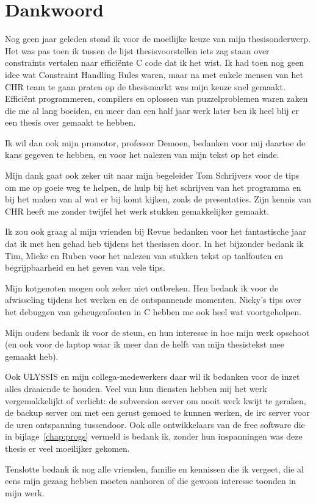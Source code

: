\section*{Dankwoord}

Nog geen jaar geleden stond ik voor de moeilijke keuze van mijn thesisonderwerp. Het was pas toen ik tussen de lijst thesisvoorstellen iets zag staan over constraints vertalen naar effici\"ente C code dat ik het wist. Ik had toen nog geen idee wat Constraint Handling Rules waren, maar na met enkele mensen van het CHR team te gaan praten op de thesismarkt was mijn keuze snel gemaakt. Effici\"ent programmeren, compilers en oplossen van puzzelproblemen waren zaken die me al lang boeiden, en meer dan een half jaar werk later ben ik heel blij er een thesis over gemaakt te hebben.

Ik wil dan ook mijn promotor, professor Demoen, bedanken voor mij daartoe de kans gegeven te hebben, en voor het nalezen van mijn tekst op het einde.

Mijn dank gaat ook zeker uit naar mijn begeleider Tom Schrijvers voor de tips om me op goeie weg te helpen, de hulp bij het schrijven van het programma en bij het maken van al wat er bij komt kijken, zoals de presentaties. Zijn kennis van CHR heeft me zonder twijfel het werk stukken gemakkelijker gemaakt.

Ik zou ook graag al mijn vrienden bij Revue bedanken voor het fantastische jaar dat ik met hen gehad heb tijdens het thesissen door. In het bijzonder bedank ik Tim, Mieke en Ruben voor het nalezen van stukken tekst op taalfouten en begrijpbaarheid en het geven van vele tips.

Mijn kotgenoten mogen ook zeker niet ontbreken. Hen bedank ik voor de afwisseling tijdens het werken en de ontspannende momenten. Nicky's tips over het debuggen van geheugenfouten in C hebben me ook heel wat voortgeholpen.

Mijn ouders bedank ik voor de steun, en hun interesse in hoe mijn werk opschoot (en ook voor de laptop waar ik meer dan de helft van mijn thesistekst mee gemaakt heb).

Ook ULYSSIS en mijn collega-medewerkers daar wil ik bedanken voor de inzet alles draaiende te houden. Veel van hun diensten hebben mij het werk vergemakkelijkt of verlicht: de subversion server om nooit werk kwijt te geraken, de backup server om met een gerust gemoed te kunnen werken, de irc server voor de uren ontspanning tussendoor. Ook alle ontwikkelaars van de free software die in bijlage~\ref{chap:progs} vermeld is bedank ik, zonder hun inspanningen was deze thesis er veel moeilijker gekomen.

Tenslotte bedank ik nog alle vrienden, familie en kennissen die ik vergeet, die al eens mijn gezaag hebben moeten aanhoren of die gewoon interesse toonden in mijn werk.
